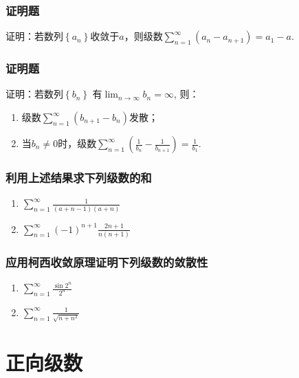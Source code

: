 \documentclass[a4paper,12pt]{article}
\begin{document}
\subsubsection{证明题}
证明：若数列$\left\{a_n\right\}$收敛于$a$，则级数$\displaystyle \sum_{n=1}^{\infty} \left( a_n - 
a_{n+1}\right) = a_1 - a$.  
\subsubsection{证明题}
证明：若数列$\left\{b_n\right\}$ 有$ \displaystyle \lim_{n \to \infty} b_n = \infty$, 则：
\begin{enumerate}[label={\rm(\arabic*)}]
    \item 级数$\displaystyle \sum_{n=1}^{\infty} \left(b_{n+1} - b_n\right)$发散；
    \item 当$\displaystyle b_n \ne 0$时，级数$\displaystyle \sum_{n = 1} ^{\infty} 
        \left( \frac{1}{b_n} - \frac{1}{b_{n+1}}\right) = \frac{1}{b_1}$.
\end{enumerate}
\subsubsection{利用上述结果求下列级数的和}
\begin{enumerate}[label={\rm(\arabic*)}]
    \item $\displaystyle \sum_{n=1}^{\infty} \frac{1}{(a+n-1)(a+n)}$
    \item $\displaystyle \sum_{n=1}^{\infty} (-1)^{n+1} \frac{2n+1}{n(n+1)}$
\end{enumerate}

\subsubsection{应用柯西收敛原理证明下列级数的敛散性}
\begin{enumerate}[label={\rm(\arabic*)}]
    \item $\displaystyle \sum_{n=1}^{\infty} \frac{\sin 2^n}{2^n}$
    \item $\displaystyle \sum_{n=1}^{\infty} \frac{1}{\sqrt{n+n^2}}$
\end{enumerate}
 
\section{正向级数}
\end{document}
